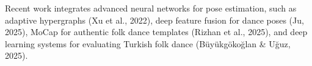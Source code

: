 Recent work integrates advanced neural networks for pose estimation, such as adaptive hypergraphs (Xu et al., 2022), deep feature fusion for dance poses (Ju, 2025), MoCap for authentic folk dance templates (Rizhan et al., 2025), and deep learning systems for evaluating Turkish folk dance (Büyükgökoğlan \& Uğuz, 2025).



